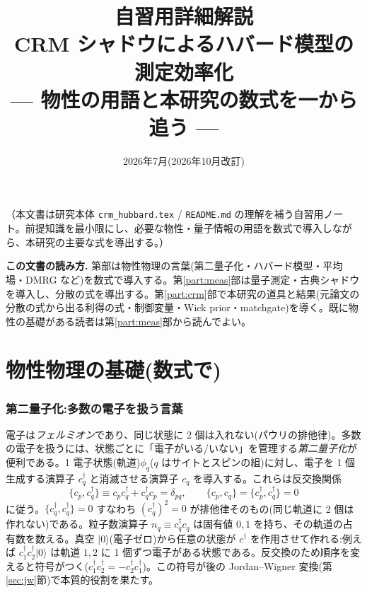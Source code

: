 \documentclass[11pt,a4paper]{ltjsarticle}
\title{\bfseries 自習用詳細解説\\[2pt] \large CRM シャドウによるハバード模型の測定効率化\\— 物性の用語と本研究の数式を一から追う —}
\author{}
\date{2026年7月(2026年10月改訂)}
\newcommand{\ket}[1]{|#1\rangle}
\newcommand{\cd}{c^\dagger}
\begin{document}
\maketitle
\vspace{-2.2em}
\begin{center}\small （本文書は研究本体 \texttt{crm\_hubbard.tex} / \texttt{README.md} の理解を補う自習用ノート。前提知識を最小限にし、必要な物性・量子情報の用語を数式で導入しながら、本研究の主要な式を導出する。）\end{center}

\tableofcontents

\bigskip
\begin{keybox}
\textbf{この文書の読み方.} 第\ref{part:cmp}部は物性物理の言葉(第二量子化・ハバード模型・平均場・DMRG など)を数式で導入する。第\ref{part:meas}部は量子測定・古典シャドウを導入し、分散の式を導出する。第\ref{part:crm}部で本研究の道具と結果(元論文の分散の式から出る利得の式・制御変量・Wick prior・matchgate)を導く。既に物性の基礎がある読者は第\ref{part:meas}部から読んでよい。
\end{keybox}

\part{物性物理の基礎(数式で)}
\label{part:cmp}

\section{第二量子化:多数の電子を扱う言葉}

電子は\emph{フェルミオン}であり、同じ状態に 2 個は入れない(パウリの排他律)。多数の電子を扱うには、状態ごとに「電子がいる/いない」を管理する\emph{第二量子化}が便利である。1 電子状態(軌道)$\phi_q$($q$ はサイトとスピンの組)に対し、電子を 1 個生成する演算子 $\cd_q$ と消滅させる演算子 $c_q$ を導入する。これらは反交換関係
\begin{equation}
  \{c_p, \cd_q\} \equiv c_p\cd_q + \cd_q c_p = \delta_{pq},\qquad
  \{c_p,c_q\}=\{\cd_p,\cd_q\}=0
  \label{eq:anticomm}
\end{equation}
に従う。$\{\cd_q,\cd_q\}=0$ すなわち $(\cd_q)^2=0$ が排他律そのもの(同じ軌道に 2 個は作れない)である。粒子数演算子 $n_q \equiv \cd_q c_q$ は固有値 $0,1$ を持ち、その軌道の占有数を数える。真空 $\ket{0}$(電子ゼロ)から任意の状態が $\cd$ を作用させて作れる:例えば $\cd_1\cd_2\ket{0}$ は軌道 $1,2$ に 1 個ずつ電子がある状態である。反交換のため順序を変えると符号がつく($\cd_1\cd_2 = -\cd_2\cd_1$)。この符号が後の Jordan--Wigner 変換(第\ref{sec:jw}節)で本質的役割を果たす。
\end{document}
